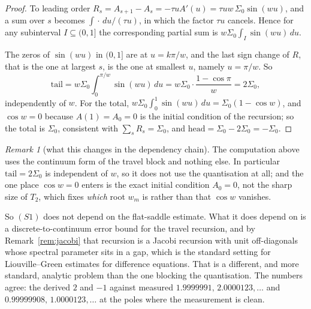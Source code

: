 \documentclass[11pt]{article}
\theoremstyle{definition}
\theoremstyle{remark}
\newtheorem{remark}[theorem]{Remark}
\theoremstyle{definition}
\begin{document}
\begin{proof}
To leading order $R_s=A_{s+1}-A_s=-\tau u A'(u)=\tau u w\,\Sigma_0\sin(wu)$, and a sum over $s$
becomes $\int\!\cdot\,du/(\tau u)$, in which the factor $\tau u$ cancels. Hence for any
subinterval $I\subseteq(0,1]$ the corresponding partial sum is $w\Sigma_0\int_I\sin(wu)\,du$.

The zeros of $\sin(wu)$ in $(0,1]$ are at $u=k\pi/w$, and the last sign change of $R$, that is the
one at largest $s$, is the one at smallest $u$, namely $u=\pi/w$. So
\[
   \mathrm{tail}=w\Sigma_0\int_0^{\pi/w}\!\!\sin(wu)\,du=w\Sigma_0\cdot\frac{1-\cos\pi}{w}=2\Sigma_0 ,
\]
independently of $w$. For the total, $w\Sigma_0\int_0^1\sin(wu)\,du=\Sigma_0(1-\cos w)$, and
$\cos w=0$ because $A(1)=A_0=0$ is the initial condition of the recursion; so the total is
$\Sigma_0$, consistent with $\sum_sR_s=\Sigma_0$, and $\mathrm{head}=\Sigma_0-2\Sigma_0=-\Sigma_0$.
\end{proof}

\begin{remark}[what this changes in the dependency chain]\label{rem:S1decoupled}
The computation above uses the continuum form of the travel block and nothing else. In
particular $\mathrm{tail}=2\Sigma_0$ is independent of $w$, so it does not use the quantisation at
all; and the one place $\cos w=0$ enters is the exact initial condition $A_0=0$, not the sharp
size of $T_2$, which fixes \emph{which} root $w_m$ is rather than that $\cos w$ vanishes.

So $(S1)$ does not depend on the flat-saddle estimate. What it does depend on is a
discrete-to-continuum error bound for the travel recursion, and by
Remark~\ref{rem:jacobi} that recursion is a Jacobi recursion with unit off-diagonals whose
spectral parameter sits in a gap, which is the standard setting for Liouville--Green estimates
for difference equations. That is a different, and more standard, analytic problem than the one
blocking the quantisation. The numbers agree: the derived $2$ and $-1$ against measured
$1.9999991,\,2.0000123,\dots$ and $0.99999908,\,1.0000123,\dots$ at the poles where the
measurement is clean.
\end{remark}
\end{document}
